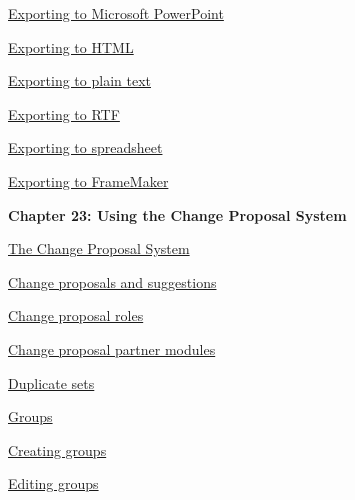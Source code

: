 \documentclass[11pt,a4paper]{article}
\begin{document}
\href{https://www.ibm.com/support/knowledgecenter/search/Exporting%20to%20Microsoft%20PowerPoint?scope=SSYQBZ_9.6.1}{Exporting to Microsoft PowerPoint}

\href{https://www.ibm.com/support/knowledgecenter/search/Exporting%20to%20HTML?scope=SSYQBZ_9.6.1}{Exporting to HTML}

\href{https://www.ibm.com/support/knowledgecenter/search/Exporting%20to%20plain%20text?scope=SSYQBZ_9.6.1}{Exporting to plain text}

\href{https://www.ibm.com/support/knowledgecenter/search/Exporting%20to%20RTF?scope=SSYQBZ_9.6.1}{Exporting to RTF}

\href{https://www.ibm.com/support/knowledgecenter/search/Exporting%20to%20spreadsheet?scope=SSYQBZ_9.6.1}{Exporting to spreadsheet}

\href{https://www.ibm.com/support/knowledgecenter/search/Exporting%20to%20FrameMaker?scope=SSYQBZ_9.6.1}{Exporting to FrameMaker} \\

\newpage

\begin{Large}\textbf{Chapter 23: Using the Change Proposal System} \end{Large} 
\vspace{1mm}

\href{https://www.ibm.com/support/knowledgecenter/search/The%20Change%20Proposal%20System?scope=SSYQBZ_9.6.1}{The Change Proposal System}

\href{https://www.ibm.com/support/knowledgecenter/search/Change%20proposals%20and%20suggestions?scope=SSYQBZ_9.6.1}{Change proposals and suggestions}

\href{https://www.ibm.com/support/knowledgecenter/search/Change%20proposal%20roles?scope=SSYQBZ_9.6.1}{Change proposal roles}

\href{https://www.ibm.com/support/knowledgecenter/search/Change%20proposal%20partner%20modules?scope=SSYQBZ_9.6.1}{Change proposal partner modules}

\href{https://www.ibm.com/support/knowledgecenter/search/Duplicate%20sets?scope=SSYQBZ_9.6.1}{Duplicate sets}

\href{https://www.ibm.com/support/knowledgecenter/search/Groups?scope=SSYQBZ_9.6.1}{Groups}

\href{https://www.ibm.com/support/knowledgecenter/search/Creating%20groups?scope=SSYQBZ_9.6.1}{Creating groups}

\href{https://www.ibm.com/support/knowledgecenter/search/Editing%20groups?scope=SSYQBZ_9.6.1}{Editing groups}
\end{document}
